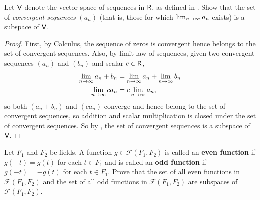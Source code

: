 \begin{exercise} \label{exercise 1.3.21}
Let \(\textsf{V}\) denote the vector space of sequences in \(\textsf{R}\), as defined in .
Show that the set of \emph{convergent sequences} \((a_n)\) (that is, those for which \(\lim_{n \to \infty} a_n\) exists) is a subspace of \(\textsf{V}\).
\end{exercise}

\begin{proof}
First, by Calculus, the sequence of zeros is convergent hence belongs to the set of convergent sequences.
Also, by limit law of sequences, given two convergent sequences \((a_n)\) and \((b_n)\) and scalar \(c \in \textsf{R}\),
\begin{align*}
    \lim_{n \to \infty} a_n + b_n & = \lim_{n \to \infty} a_n + \lim_{n \to \infty} b_n \\
    \lim_{n \to \infty} c a_n & = c \lim_{n \to \infty} a_n,
\end{align*}
so both \((a_n + b_n)\) and \((c a_n)\) converge and hence belong to the set of convergent sequences, so addition and scalar multiplication is closed under the set of convergent sequences.
So by , the set of convergent sequences is a subspace of \(\textsf{V}\).
\end{proof}

\begin{exercise} \label{exercise 1.3.22}
Let \(F_1\) and \(F_2\) be fields.
A function \(g \in \mathcal{F}(F_1, F_2)\) is called an \textbf{even function} if \(g(-t) = g(t)\) for each \(t \in F_1\)
and is called an \textbf{odd function} if \(g(-t) = -g(t)\) for each \(t \in F_1\).
Prove that the set of all even functions in \(\mathcal{F}(F_1, F_2)\) and the set of all odd functions in \(\mathcal{F}(F_1, F_2)\) are subspaces of \(\mathcal{F}(F_1, F_2)\).
\end{exercise}

